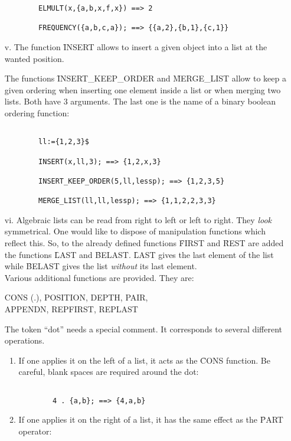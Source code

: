 \begin{itemize}
\begin{verbatim}
        ELMULT(x,{a,b,x,f,x}) ==> 2

        FREQUENCY({a,b,c,a}); ==> {{a,2},{b,1},{c,1}}

\end{verbatim}
\item[v.]
The function \f{INSERT} allows to insert a given object into a list
at the wanted position.

The functions \f{INSERT\_KEEP\_ORDER} and \f{MERGE\_LIST} allow to
keep a given ordering when inserting one element inside a list or
when merging two lists. Both have 3 arguments. The last one  is
the name of a binary boolean ordering function:
\begin{verbatim}

        ll:={1,2,3}$

        INSERT(x,ll,3); ==> {1,2,x,3}

        INSERT_KEEP_ORDER(5,ll,lessp); ==> {1,2,3,5}

        MERGE_LIST(ll,ll,lessp); ==> {1,1,2,2,3,3}

\end{verbatim}
\item[vi.]
Algebraic lists can be read from right to left or left to right.
They {\em look} symmetrical. One would like to dispose of manipulation
functions which reflect this.
So, to the already defined functions  \f{FIRST} and \f{REST} are
added the functions \f{LAST}  and \f{BELAST}. \f{LAST} gives the last
element of the list while \f{BELAST} gives the list {\em without} its
last element. \\
Various additional functions are provided. They are:
\bq

\f{ CONS (.), POSITION, DEPTH, PAIR, \\
APPENDN, REPFIRST, REPLAST}

\eq
The token ``dot'' needs a special comment. It corresponds to
several different operations.
\begin{enumerate}
\item If one applies it on the left of a list, it acts as the \f{CONS}
function. Be careful, blank spaces are required around the dot:
\begin{verbatim}

        4 . {a,b}; ==> {4,a,b}

\end{verbatim}
\item If one applies it on the right of a list, it has the same
effect as the \f{PART} operator:
\begin{verbatim}


\end{verbatim}
\end{enumerate}
\end{itemize}
